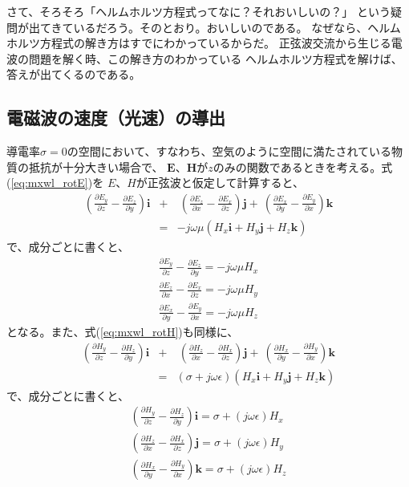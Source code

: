 さて、そろそろ「ヘルムホルツ方程式ってなに？それおいしいの？」
という疑問が出てきているだろう。そのとおり。おいしいのである。
なぜなら、ヘルムホルツ方程式の解き方はすでにわかっているからだ。
正弦波交流から生じる電波の問題を解く時、この解き方のわかっている
ヘルムホルツ方程式を解けば、答えが出てくるのである。

\subsection*{電磁波の速度（光速）の導出}
導電率$\sigma=0$の空間において、すなわち、空気のように空間に満たされている物質の抵抗が十分大きい場合で、
$\bm{E}$、$\bm{H}$が$z$のみの関数であるときを考える。式(\ref{eq:mxwl_rotE})を
$E$、$H$が正弦波と仮定して計算すると、
\begin{eqnarray}
(\frac{\partial E_y}{\partial z} - \frac{\partial E_z}{\partial y})\bm{i} &+&\
(\frac{\partial E_z}{\partial x} - \frac{\partial E_x}{\partial z})\bm{j} +\
(\frac{\partial E_x}{\partial y} - \frac{\partial E_y}{\partial x})\bm{k} \nonumber\\
 &=& -j\omega\mu(H_x\bm{i}+H_y\bm{j}+H_z\bm{k}) 
\end{eqnarray}
 で、成分ごとに書くと、
\begin{eqnarray}
\frac{\partial E_y}{\partial z} - \frac{\partial E_z}{\partial y} =- j\omega\mu H_x  \\
\frac{\partial E_z}{\partial x} - \frac{\partial E_x}{\partial z} =- j\omega\mu H_y  \label{eq:plane_waveEzExHy}\\
\frac{\partial E_x}{\partial y} - \frac{\partial E_y}{\partial x} = - j\omega\mu H_z  
\end{eqnarray}
となる。また、式(\ref{eq:mxwl_rotH})も同様に、
\begin{eqnarray}
(\frac{\partial H_y}{\partial z} - \frac{\partial H_z}{\partial y})\bm{i} &+&\
(\frac{\partial H_z}{\partial x} - \frac{\partial H_x}{\partial z})\bm{j} +\
(\frac{\partial H_x}{\partial y} - \frac{\partial H_y}{\partial x})\bm{k} \nonumber \\
&=&(\sigma + j\omega\epsilon)(H_x\bm{i}+H_y\bm{j}+H_z\bm{k})
\end{eqnarray}
で、成分ごとに書くと、
\begin{eqnarray}
(\frac{\partial H_y}{\partial z} - \frac{\partial H_z}{\partial y})\bm{i} = \sigma + (j\omega\epsilon)H_x\\
(\frac{\partial H_z}{\partial x} - \frac{\partial H_x}{\partial z})\bm{j} = \sigma + (j\omega\epsilon)H_y\\
(\frac{\partial H_x}{\partial y} - \frac{\partial H_y}{\partial x})\bm{k} = \sigma + (j\omega\epsilon)H_z
\end{eqnarray}
